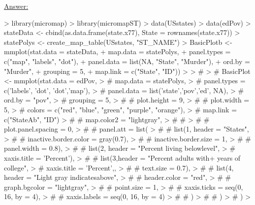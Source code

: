 \documentclass[12pt,letterpaper,final]{article}
\begin{document}
\begin{enumerate}
\begin{enumerate}
\underline{Answer:}
{\scriptsize
\begin{Schunk}
\begin{Sinput}
> library(micromap)
> library(micromapST)
> data(USstates)
> data(edPov)
> stateData <- cbind(as.data.frame(state.x77), State = rownames(state.x77))
> statePolys <- create_map_table(USstates, "ST_NAME")
> BasicPlotb <- mmplot(stat.data = stateData,
+                      map.data = statePolys,
+                      panel.types = c("map", "labels", "dot"),
+                      panel.data = list(NA, "State", "Murder"),
+                      ord.by = "Murder",
+                      grouping = 5,
+                      map.link = c("State", "ID"))
> 
> # 
> # BasicPlot <- mmplot(stat.data = edPov,
> #                     map.data = statePolys, 
> #                     panel.types = c('labels', 'dot', 'dot','map'),
> #                     panel.data = list('state','pov','ed', NA),
> #                     ord.by = "pov",
> #                     grouping = 5,
> #                     # plot.height = 9,
> #                     # plot.width = 5,
> #                     colors = c("red", "blue", "green", "purple", "orange"),
> #                     map.link = c("StateAb", "ID")
> #                     # map.color2 = "lightgray", 
> #                     # 
> #                     # plot.panel.spacing = 0,
> #                     # panel.att = list(
> #                     #    list(1, header = "States",
> #                     #        inactive.border.color = gray(0.7),
> #                     #        inactive.border.size = 1,
> #                     #        panel.width = 0.8),
> #                     #   list(2, header = "Percent living below\npoverty level", 
> #               xaxis.title = 'Percent'),
> #                     #   list(3,header = "Percent adults with+ years of college", 
> #               xaxis.title = 'Percent',,
> #                     #        text.size = 0.7),
> #                     #   list(4, header = "Light gray indicates\nhighlighted above",
> #                     #        header.color = "red",
> #                     #        graph.bgcolor = "lightgray",
> #                     #        point.size = 1,
> #                     #        xaxis.ticks = seq(0, 16, by = 4),
> #                     #        xaxis.labels = seq(0, 16, by = 4)
> #                     #        )
> #                     # )
> # )
> 
\end{Sinput}
\end{Schunk}
}
\end{enumerate}
\end{enumerate}
\end{document}
